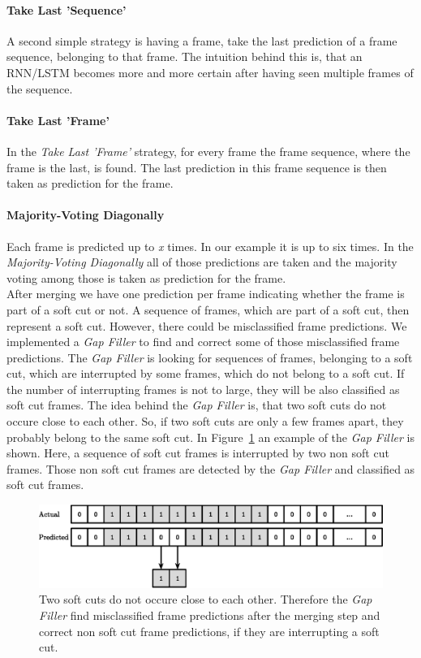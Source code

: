 \paragraph{Take Last 'Sequence'}
A second simple strategy is having a frame, take the last prediction of a frame sequence, belonging to that frame.
The intuition behind this is, that an RNN/LSTM becomes more and more certain after having seen multiple frames of the sequence.

\paragraph{Take Last 'Frame'}
In the \textit{Take Last 'Frame'} strategy, for every frame the frame sequence, where the frame is the last, is  found. The last prediction in this frame sequence is then taken as prediction for the frame.

\paragraph{Majority-Voting Diagonally}
Each frame is predicted up to \textit{x} times.
In our example it is up to six times.
In the \textit{Majority-Voting Diagonally} all of those predictions are taken and the majority voting among those is taken as prediction for the frame. \\

After merging we have one prediction per frame indicating whether the frame is part of a soft cut or not.
A sequence of frames, which are part of a soft cut, then represent a soft cut.
However, there could be misclassified frame predictions.
We implemented a \textit{Gap Filler} to find and correct some of those misclassified frame predictions.
The \textit{Gap Filler} is looking for sequences of frames, belonging to a soft cut, which are interrupted by some frames, which do not belong to a soft cut.
If the number of interrupting frames is not to large, they will be also classified as soft cut frames.
The idea behind the \textit{Gap Filler} is, that two soft cuts do not occure close to each other.
So, if two soft cuts are only a few frames apart, they probably belong to the same soft cut.
In Figure~\ref{fig:gap_filler} an example of the \textit{Gap Filler} is shown.
Here, a sequence of soft cut frames is interrupted by two non soft cut frames.
Those non soft cut frames are detected by the \textit{Gap Filler} and classified as soft cut frames.
\begin{figure}[!htb]
	\centering
	\includegraphics[scale=.7]{images/gap_filler.eps}
	\caption{Two soft cuts do not occure close to each other. Therefore the \textit{Gap Filler} find misclassified frame predictions after the merging step and correct non soft cut frame predictions, if they are interrupting a soft cut.}
	\label{fig:gap_filler}
\end{figure}

